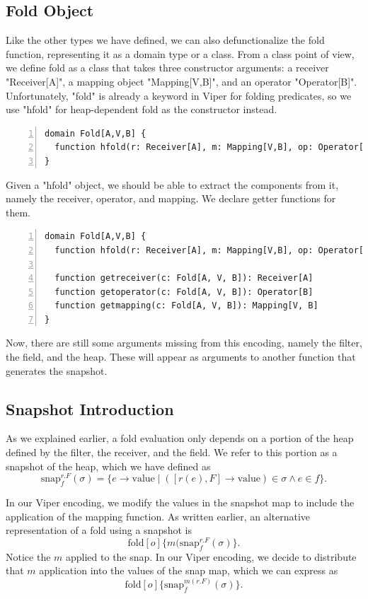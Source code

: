 \documentclass[msc,oneside]{ubcthesis}
\theoremstyle{definition}
\begin{document}
\subsection{Fold Object}
Like the other types we have defined, we can also defunctionalize the fold function, representing it as a domain type or a class. From a class point of view, we define fold as a class that takes three constructor arguments: a receiver "Receiver[A]", a mapping object "Mapping[V,B]", and an operator "Operator[B]". Unfortunately, "fold" is already a keyword in Viper for folding predicates, so we use "hfold" for heap-dependent fold as the constructor instead.
\begin{lstlisting}[language=silver,numbers=left, firstnumber=1, stepnumber=1]
domain Fold[A,V,B] {
  function hfold(r: Receiver[A], m: Mapping[V,B], op: Operator[B]): Fold[A,V,B]
}
\end{lstlisting}

Given a "hfold" object, we should be able to extract the components from it, namely the receiver, operator, and mapping. We declare getter functions for them.
\begin{lstlisting}[language=silver,numbers=left, firstnumber=1, stepnumber=1]
domain Fold[A,V,B] {
  function hfold(r: Receiver[A], m: Mapping[V,B], op: Operator[B]): Fold[A,V,B]
  
  function getreceiver(c: Fold[A, V, B]): Receiver[A] 
  function getoperator(c: Fold[A, V, B]): Operator[B] 
  function getmapping(c: Fold[A, V, B]): Mapping[V, B] 
}
\end{lstlisting}
Now, there are still some arguments missing from this encoding, namely the filter, the field, and the heap. These will appear as arguments to another function that generates the snapshot.

\subsection{Snapshot Introduction}
As we explained earlier, a fold evaluation only depends on a portion of the heap defined by the filter, the receiver, and the field. We refer to this portion as a snapshot of the heap, which we have defined as $$\textrm{snap}^{r.F}_{f}(\sigma) = \{ e \rightarrow \textrm{value} \mid ([r(e), F] \rightarrow \textrm{value}) \in \sigma \land e \in f\}.$$

In our Viper encoding, we modify the values in the snapshot map to include the application of the mapping function. As written earlier, an alternative representation of a fold using a snapshot is $$\textrm{fold}[o]\{m(\textrm{snap}^{r.F}_{f}(\sigma)\}.$$ Notice the $m$ applied to the snap. In our Viper encoding, we decide to distribute that $m$ application into the values of the snap map, which we can express as $$\textrm{fold}[o]\{\textrm{snap}^{m(r.F)}_{f}(\sigma)\}.$$
\end{document}
